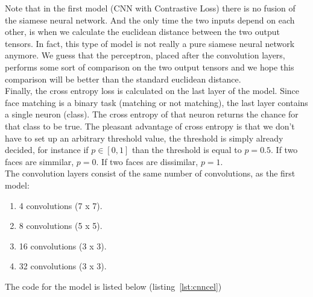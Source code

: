  Note that in the first model (CNN with Contrastive Loss) there is no fusion of the siamese neural network. And the only time the two inputs depend on each other, is when we calculate the euclidean distance between the two output tensors. In fact, this type of model is not really a pure siamese neural network anymore. We guess that the perceptron, placed after the convolution layers, performs some sort of comparison on the two output tensors and we hope this comparison will be better than the standard euclidean distance.\\

 Finally, the cross entropy loss is calculated on the last layer of the model. Since face matching is a binary task (matching or not matching), the last layer contains a single neuron (class). The cross entropy of that neuron returns the chance for that class to be true. The pleasant advantage of cross entropy is that we don't have to set up an arbitrary threshold value, the threshold is simply already decided, for instance if $p \in [0,1]$ than the threshold is equal to $p = 0.5$. If two faces are simmilar, $p=0$. If two faces are dissimilar, $p=1$.\\

 The convolution layers consist of the same number of convolutions, as the first model:

 \begin{enumerate}
   \item 4 convolutions (7 x 7).
   \item 8 convolutions (5 x 5).
   \item 16 convolutions (3 x 3).
   \item 32 convolutions (3 x 3).
 \end{enumerate}

 The code for the model is listed below (listing~\ref{lst:cnncel})

